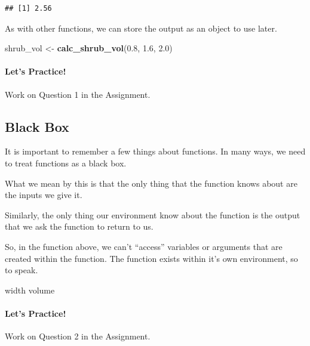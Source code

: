 \documentclass[
]{article}
\newenvironment{Shaded}{\begin{snugshade}}{\end{snugshade}}
\newcommand{\FloatTok}[1]{\textcolor[rgb]{0.00,0.00,0.81}{#1}}
\newcommand{\FunctionTok}[1]{\textcolor[rgb]{0.13,0.29,0.53}{\textbf{#1}}}
\newcommand{\NormalTok}[1]{#1}
\newcommand{\OtherTok}[1]{\textcolor[rgb]{0.56,0.35,0.01}{#1}}
\begin{document}
\begin{verbatim}
## [1] 2.56
\end{verbatim}

As with other functions, we can store the output as an object to use
later.

\begin{Shaded}
\begin{Highlighting}[]
\NormalTok{shrub\_vol }\OtherTok{\textless{}{-}} \FunctionTok{calc\_shrub\_vol}\NormalTok{(}\FloatTok{0.8}\NormalTok{, }\FloatTok{1.6}\NormalTok{, }\FloatTok{2.0}\NormalTok{)}
\end{Highlighting}
\end{Shaded}

\paragraph{Let's Practice!}\label{lets-practice}

Work on Question 1 in the Assignment.

\subsection{Black Box}\label{black-box}

It is important to remember a few things about functions. In many ways,
we need to treat functions as a black box.

What we mean by this is that the only thing that the function knows
about are the inputs we give it.

Similarly, the only thing our environment know about the function is the
output that we ask the function to return to us.

So, in the function above, we can't ``access'' variables or arguments
that are created within the function. The function exists within it's
own environment, so to speak.

\begin{Shaded}
\begin{Highlighting}[]
\NormalTok{width}
\NormalTok{volume}
\end{Highlighting}
\end{Shaded}

\paragraph{Let's Practice!}\label{lets-practice-1}

Work on Question 2 in the Assignment.
\end{document}
